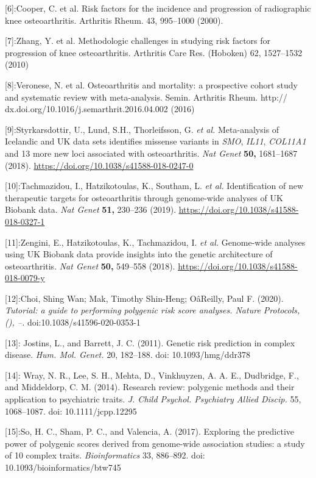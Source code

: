\documentclass[
]{article}
\begin{document}
{[}6{]}:Cooper, C. et al. Risk factors for the incidence and progression
of radiographic knee osteoarthritis. Arthritis Rheum. 43, 995--1000
(2000).

{[}7{]}:Zhang, Y. et al. Methodologic challenges in studying risk
factors for progression of knee osteoarthritis. Arthritis Care Res.
(Hoboken) 62, 1527--1532 (2010)

{[}8{]}:Veronese, N. et al. Osteoarthritis and mortality: a prospective
cohort study and systematic review with meta-analysis. Semin. Arthritis
Rheum. http:// dx.doi.org/10.1016/j.semarthrit.2016.04.002 (2016)

{[}9{]}:Styrkarsdottir, U., Lund, S.H., Thorleifsson, G. \emph{et al.}
Meta-analysis of Icelandic and UK data sets identifies missense variants
in \emph{SMO}, \emph{IL11}, \emph{COL11A1} and 13 more new loci
associated with osteoarthritis. \emph{Nat Genet} \textbf{50,} 1681--1687
(2018). \url{https://doi.org/10.1038/s41588-018-0247-0}

{[}10{]}:Tachmazidou, I., Hatzikotoulas, K., Southam, L. \emph{et al.}
Identification of new therapeutic targets for osteoarthritis through
genome-wide analyses of UK Biobank data. \emph{Nat Genet} \textbf{51,}
230--236 (2019). \url{https://doi.org/10.1038/s41588-018-0327-1}

{[}11{]}:Zengini, E., Hatzikotoulas, K., Tachmazidou, I. \emph{et al.}
Genome-wide analyses using UK Biobank data provide insights into the
genetic architecture of osteoarthritis. \emph{Nat Genet} \textbf{50,}
549--558 (2018). \url{https://doi.org/10.1038/s41588-018-0079-y}

{[}12{]}:Choi, Shing Wan; Mak, Timothy Shin-Heng; OâReilly, Paul F.
(2020). \emph{Tutorial: a guide to performing polygenic risk score
analyses. Nature Protocols, (), --.} doi:10.1038/s41596-020-0353-1

{[}13{]}: Jostins, L., and Barrett, J. C. (2011). Genetic risk
prediction in complex disease. \emph{Hum. Mol. Genet.} 20, 182--188.
doi: 10.1093/hmg/ddr378

{[}14{]}: Wray, N. R., Lee, S. H., Mehta, D., Vinkhuyzen, A. A. E.,
Dudbridge, F., and Middeldorp, C. M. (2014). Research review: polygenic
methods and their application to psychiatric traits. \emph{J. Child
Psychol. Psychiatry Allied Discip.} 55, 1068--1087. doi:
10.1111/jcpp.12295

{[}15{]}:So, H. C., Sham, P. C., and Valencia, A. (2017). Exploring the
predictive power of polygenic scores derived from genome-wide
association studies: a study of 10 complex traits. \emph{Bioinformatics}
33, 886--892. doi: 10.1093/bioinformatics/btw745
\end{document}
